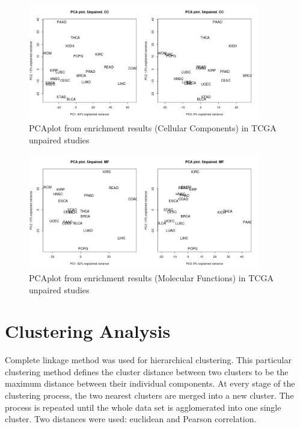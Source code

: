 \documentclass[a4paper,12pt]{article}
\begin{document}
\begin{figure}[!h] 
\centering 
\includegraphics[width=0.9\textwidth]{img/pca_cc_unpaired.png} 
\caption{PCAplot from enrichment results (Cellular Components) in TCGA unpaired studies} 
\label{figPCA_cc_unpaired} 
\end{figure} 

\begin{figure}[!h] 
\centering 
\includegraphics[width=0.9\textwidth]{img/pca_mf_unpaired.png} 
\caption{PCAplot from enrichment results (Molecular Functions) in TCGA unpaired studies} 
\label{figPCA_mf_unpaired} 
\end{figure} 

\clearpage

\section{Clustering Analysis}

Complete linkage method was used for hierarchical clustering. 
This particular clustering method defines the cluster distance between two clusters to be the maximum distance between their individual components.
At every stage of the clustering process, the two nearest clusters are merged into a new cluster. 
The process is repeated until the whole data set is agglomerated into one single cluster. Two distances were used: euclidean and Pearson correlation.
\end{document}
